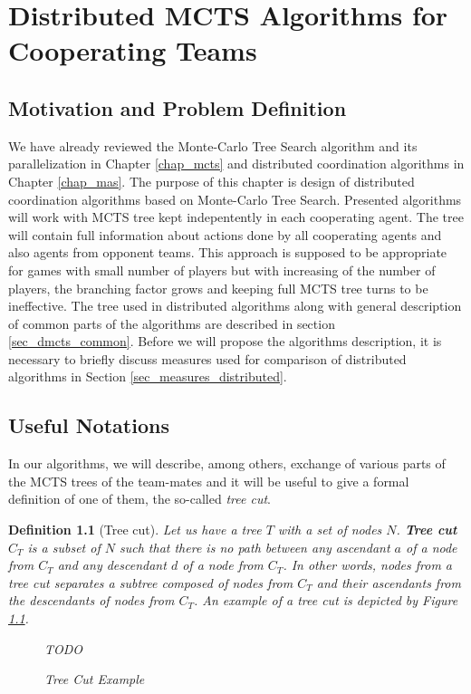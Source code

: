 \chapter{Distributed MCTS Algorithms for Cooperating Teams}
\label{chap_dmcts_design}

\section{Motivation and Problem Definition}


We have already reviewed the Monte-Carlo Tree Search algorithm and its parallelization in
 Chapter \ref{chap_mcts} and distributed coordination algorithms in Chapter \ref{chap_mas}.
 The purpose of this chapter is design of distributed coordination algorithms based on
 Monte-Carlo Tree Search. Presented algorithms will work with MCTS tree kept indepentently in
 each cooperating agent. The tree will contain full information about actions done by all
 cooperating agents and also agents from opponent teams. This approach is supposed to be
 appropriate for games with small number of players but with increasing of the number of
 players, the branching factor grows and keeping full MCTS tree turns to be ineffective. The
 tree used in distributed algorithms along with general description of common parts of the
 algorithms are described in section \ref{sec_dmcts_common}. Before we will propose the
 algorithms description, it is necessary to briefly discuss measures used for comparison of
 distributed algorithms in Section \ref{sec_measures_distributed}. 

\section{Useful Notations}

In our algorithms, we will describe, among others, exchange of various parts of the MCTS trees of
the team-mates and it will be useful to give a formal definition of one of them, the so-called
\emph{tree cut}.

\newtheorem*{deftreecut}{Definition}
\begin{deftreecut}[Tree cut]

Let us have a tree $T$ with a set of nodes $N$. \textbf{Tree cut} $C_T$ is a subset of $N$ such that
there is no path between any ascendant $a$ of a node from $C_T$ and any descendant $d$ of a node from
$C_T$. In other words, nodes from a tree cut separates a subtree composed of nodes from $C_T$ and
their ascendants from the descendants of nodes from $C_T$. An example of a tree cut is depicted by
Figure \ref{fig_tree_cut_example}.

\begin{figure}
\begin{center}
\end{center}
\caption{\footnotesize Tree Cut Example}{\footnotesize TODO}
\label{fig_tree_cut_example}
\end{figure}

\end{deftreecut}


